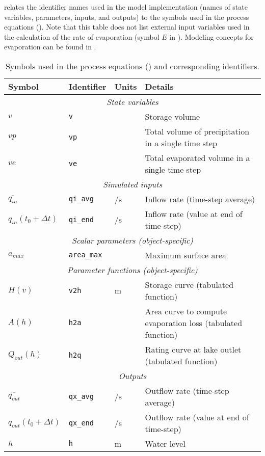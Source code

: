  relates the identifier names used in the model implementation (names of state variables, parameters, inputs, and outputs) to the symbols used in the process equations (). Note that this table does not list external input variables used in the calculation of the rate of evaporation (symbol $E$ in ). Modeling concepts for evaporation can be found in .

\begin{table*}
\caption{Symbols used in the process equations () and corresponding identifiers. \label{tab:resStor_lake_implementation}}
\begin{tabular}{|p{}p{}p{}p{}|}  \hline
\rowcolor[gray]{0.9}
Symbol & Identifier & Units & Details \\ \hline
\multicolumn{4}{|c|}{\textit{State variables}} \\
$v$ & \verb!v! & \cbm{} & Storage volume \\
$vp$ & \verb!vp! & \cbm{} & Total volume of precipitation in a single time step \\
$ve$ & \verb!ve! & \cbm{} & Total evaporated volume in a single time step \\ \hline
\multicolumn{4}{|c|}{\textit{Simulated inputs}} \\
$\overline{q_{in}}$ & \verb!qi_avg! & \cbm{}/s & Inflow rate (time-step average) \\
$q_{in}(t_0 + \Delta t)$ & \verb!qi_end! & \cbm{}/s & Inflow rate (value at end of time-step) \\  \hline
\multicolumn{4}{|c|}{\textit{Scalar parameters (object-specific)}} \\
$a_{max}$ & \verb!area_max! & \sqm{} & Maximum surface area \\  \hline
\multicolumn{4}{|c|}{\textit{Parameter functions (object-specific)}} \\
$H(v)$ & \verb!v2h! & m & Storage curve (tabulated function) \\
$A(h)$ & \verb!h2a! & \sqm{} & Area curve to compute evaporation loss (tabulated function) \\
$Q_{out}(h)$ & \verb!h2q! & \sqm{} & Rating curve at lake outlet (tabulated function) \\  \hline
\multicolumn{4}{|c|}{\textit{Outputs}} \\
$\overline{q_{out}}$ & \verb!qx_avg! & \cbm{}/s & Outflow rate (time-step average) \\
$q_{out}(t_0 + \Delta t)$ & \verb!qx_end! & \cbm{}/s & Outflow rate (value at end of time-step) \\
$h$ & \verb!h! & m & Water level \\ \hline
\end{tabular}
\end{table*}


